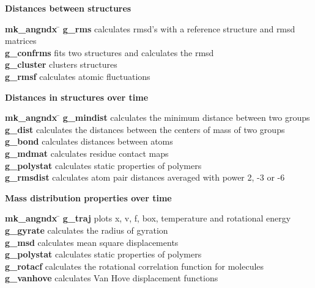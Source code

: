\begin{description}
\item {\large\bf Distances between structures}
\vspace{-2ex}\begin{tabbing}
{\bf mk\_angndx} \= \kill
{\bf g\_rms} \> calculates rmsd's with a reference structure and rmsd matrices \\
{\bf g\_confrms} \> fits two structures and calculates the rmsd  \\
{\bf g\_cluster} \> clusters structures \\
{\bf g\_rmsf} \> calculates atomic fluctuations \\
\end{tabbing}\vspace{-2ex}

\item {\large\bf Distances in structures over time}
\vspace{-2ex}\begin{tabbing}
{\bf mk\_angndx} \= \kill
{\bf g\_mindist} \> calculates the minimum distance between two groups \\
{\bf g\_dist} \> calculates the distances between the centers of mass of two groups \\
{\bf g\_bond} \> calculates distances between atoms \\
{\bf g\_mdmat} \> calculates residue contact maps \\
{\bf g\_polystat} \> calculates static properties of polymers \\
{\bf g\_rmsdist} \> calculates atom pair distances averaged with power 2, -3 or -6 \\
\end{tabbing}\vspace{-2ex}

\item {\large\bf Mass distribution properties over time}
\vspace{-2ex}\begin{tabbing}
{\bf mk\_angndx} \= \kill
{\bf g\_traj} \> plots x, v, f, box, temperature and rotational energy \\
{\bf g\_gyrate} \> calculates the radius of gyration \\
{\bf g\_msd} \> calculates mean square displacements \\
{\bf g\_polystat} \> calculates static properties of polymers \\
{\bf g\_rotacf} \> calculates the rotational correlation function for molecules \\
{\bf g\_vanhove} \> calculates Van Hove displacement functions \\
\end{tabbing}\vspace{-2ex}


\end{description}
